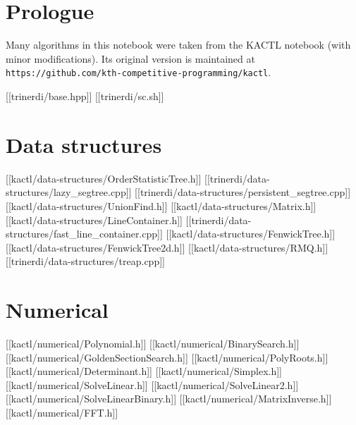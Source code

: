 

\dotoc

\chapter{Prologue}

Many algorithms in this notebook were taken from the KACTL notebook (with minor
modifications). Its original version is maintained at {\tt
https://github.com/kth-competitive-programming/kactl}.

[[trinerdi/base.hpp]]
[[trinerdi/sc.sh]]



\chapter{Data structures}

[[kactl/data-structures/OrderStatisticTree.h]]
[[trinerdi/data-structures/lazy_segtree.cpp]]
[[trinerdi/data-structures/persistent_segtree.cpp]]
[[kactl/data-structures/UnionFind.h]]
[[kactl/data-structures/Matrix.h]]
[[kactl/data-structures/LineContainer.h]]
[[trinerdi/data-structures/fast_line_container.cpp]]
[[kactl/data-structures/FenwickTree.h]]
[[kactl/data-structures/FenwickTree2d.h]]
[[kactl/data-structures/RMQ.h]]
[[trinerdi/data-structures/treap.cpp]]

\chapter{Numerical}

[[kactl/numerical/Polynomial.h]]
[[kactl/numerical/BinarySearch.h]]
[[kactl/numerical/GoldenSectionSearch.h]]
[[kactl/numerical/PolyRoots.h]]
[[kactl/numerical/Determinant.h]]
[[kactl/numerical/Simplex.h]]
[[kactl/numerical/SolveLinear.h]]
[[kactl/numerical/SolveLinear2.h]]
[[kactl/numerical/SolveLinearBinary.h]]
[[kactl/numerical/MatrixInverse.h]]
[[kactl/numerical/FFT.h]]

